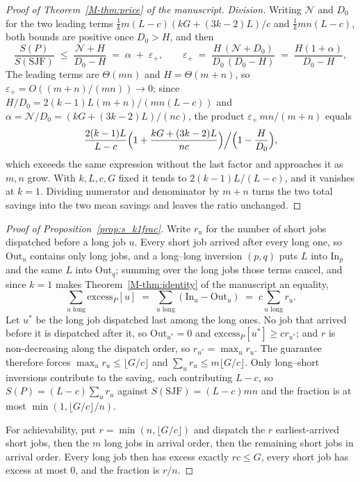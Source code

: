 \documentclass[mathematics,supfile,submit,moreauthors]{Definitions/mdpi}
\begin{document}
\begin{proof}[Proof of Theorem~\ref*{M-thm:price} of the manuscript]
\emph{Division.} Writing $\mathcal{N}$ and $D_0$ for the two leading
terms $\tfrac{1}{k} m (L-c)(kG + (3k-2)L)/c$ and
$\tfrac{1}{k} m n (L-c)$, both bounds are positive once
$D_0 > H$, and then
\[
  \frac{S(P)}{S(\mathrm{SJF})}
  \;\le\; \frac{\mathcal{N} + H}{D_0 - H}
  \;=\; \alpha \;+\; \varepsilon_+ ,
  \qquad
  \varepsilon_+ \;=\; \frac{H\,(\mathcal{N} + D_0)}
                         {D_0\,(D_0 - H)}
  \;=\; \frac{H(1+\alpha)}{D_0 - H} ,
\]
The leading terms are
$\Theta(mn)$ and $H = \Theta(m+n)$, so
$\varepsilon_+ = O((m+n)/(mn)) \to 0$; since
$H/D_0 = 2(k-1)L(m+n)/(mn(L-c))$ and
$\alpha = \mathcal{N}/D_0 = (kG+(3k-2)L)/(nc)$, the product $\varepsilon_+\,mn/(m+n)$ equals
\[
  \frac{2(k-1)L}{L-c}
  \Bigl(1 + \frac{kG + (3k-2)L}{nc}\Bigr)
  \Big/ \Bigl(1 - \frac{H}{D_0}\Bigr) ,
\]
which exceeds the same expression without the last factor and approaches it as
$m,n$ grow. With $k,L,c,G$ fixed it tends to
$2(k-1)L/(L-c)$, and it vanishes at $k=1$.
Dividing numerator and denominator by $m+n$ turns the two total savings into the
two mean savings and leaves the ratio unchanged.
\end{proof}

\begin{proof}[Proof of Proposition~\ref{prop:s_k1frac}]
Write $r_u$ for the number of short jobs dispatched before a long job $u$. Every
short job arrived after every long one, so $\mathrm{Out}_u$ contains only long
jobs, and a long--long inversion $(p,q)$ puts $L$ into $\mathrm{In}_p$ and the
same $L$ into $\mathrm{Out}_q$; summing over the long jobs those terms cancel,
and since $k = 1$ makes Theorem~\ref*{M-thm:identity} of the manuscript an equality,
\[
  \sum_{u \text{ long}} \mathrm{excess}_P[u]
  \;=\; \sum_{u \text{ long}} (\mathrm{In}_u - \mathrm{Out}_u)
  \;=\; c \sum_{u \text{ long}} r_u .
\]
Let $u^{*}$ be the long job dispatched last among the long ones. No job that
arrived before it is dispatched after it, so $\mathrm{Out}_{u^{*}} = 0$ and
$\mathrm{excess}_P[u^{*}] \ge c r_{u^{*}}$; and $r$ is non-decreasing along
the dispatch order, so $r_{u^{*}} = \max_u r_u$. The guarantee therefore forces
$\max_u r_u \le \lfloor G/c \rfloor$ and
$\sum_u r_u \le m \lfloor G/c \rfloor$. Only long--short inversions
contribute to the saving, each contributing $L - c$, so
$S(P) = (L-c)\sum_u r_u$ against $S(\mathrm{SJF}) = (L-c)mn$ and the
fraction is at most $\min(1, \lfloor G/c \rfloor / n)$.

For achievability, put $r = \min(n, \lfloor G/c \rfloor)$ and dispatch the
$r$ earliest-arrived short jobs, then the $m$ long jobs in arrival order, then the
remaining short jobs in arrival order. Every long job then has excess exactly
$rc \le G$, every short job has excess at most $0$, and the fraction is
$r/n$.
\end{proof}
\end{document}
